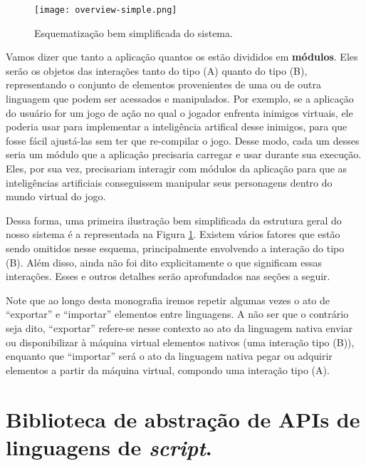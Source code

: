     \begin{figure}[ht]
      \centering
      \texttt{[image: overview-simple.png]}
      \caption{Esquematização bem simplificada do sistema.}
      \label{fig:overview-simple}
    \end{figure}

    Vamos dizer que tanto a aplicação quantos os  estão divididos
    em \textbf{módulos}. Eles serão os objetos das interações tanto do tipo (A)
    quanto do tipo (B), representando o conjunto de elementos provenientes de
    uma ou de outra linguagem que podem ser acessados e manipulados. Por
    exemplo, se a aplicação do usuário for um jogo de ação no qual o jogador
    enfrenta inimigos virtuais, ele poderia usar  para implementar a
    inteligência artifical desse inimigos, para que fosse fácil ajustá-las sem
    ter que re-compilar o jogo. Desse modo, cada um desses  seria um
    módulo que a aplicação precisaria carregar e usar durante sua execução.
    Eles, por sua vez, precisariam interagir com módulos da aplicação para que
    as inteligências artificiais conseguissem manipular seus personagens dentro
    do mundo virtual do jogo.

    Dessa forma, uma primeira ilustração bem simplificada da estrutura geral do
    nosso sistema é a representada na Figura \ref{fig:overview-simple}. Existem
    vários fatores que estão sendo omitidos nesse esquema, principalmente
    envolvendo a interação do tipo (B). Além disso, ainda não foi dito
    explicitamente o que significam essas interações. Esses e outros detalhes
    serão aprofundados nas seções a seguir.
    
    Note que ao longo desta monografia iremos repetir algumas vezes o ato de
    ``exportar'' e ``importar'' elementos entre linguagens. A não ser que o
    contrário seja dito, ``exportar'' refere-se nesse contexto ao ato da
    linguagem nativa enviar ou disponibilizar à máquina virtual elementos
    nativos (uma interação tipo (B)), enquanto que ``importar'' será o ato
    da linguagem nativa pegar ou adquirir elementos a partir da máquina virtual,
    compondo uma interação tipo (A).

  \section{Biblioteca de abstração de APIs de linguagens de \emph{script}.}
  \label{sec:estrutura:opa}
  
